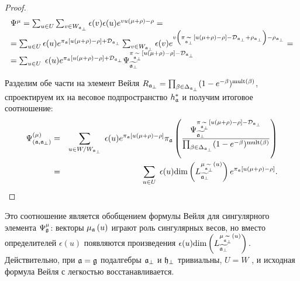 \begin{proof}
\begin{equation*}
\begin{array}{l}
\Psi^{\mu }=\sum_{u\in U}\sum_{v\in W_{\af_{\perp }}}
\epsilon (v)\epsilon (u)e^{vu(\mu +\rho )-\rho }= \\
=\sum_{u\in U}\epsilon (u)e^{\pi _{\af}\left[ u(\mu +\rho )-\rho \right]
+\mathcal{D}_{\af_{\perp }}}\sum_{v\in W_{\af_{\perp }}}\epsilon
(v)e^{v\left( \pi _{ \widetilde{\af_{\perp }} }\left[
u(\mu +\rho )-\rho \right] -\mathcal{D}_{\af_{\perp }}+\rho _{\af%
_{\perp }}\right) -\rho _{\af_{\perp }}}= \\
=\sum_{u\in U}\;\epsilon (u)e^{\pi _{\af }\left[ u(\mu
+\rho )-\rho \right] +\mathcal{D}_{\af_{\perp }}}\Psi _{\widetilde{%
\af_{\perp }}}^{\pi _{ \widetilde{\af_{\perp }} }%
\left[ u(\mu +\rho )-\rho \right] -\mathcal{D}_{\af_{\perp }}}
\end{array}
\end{equation*}

Разделим обе части на элемент Вейля  $R_{\mathfrak{a}_{\perp }}=\prod_{\beta \in \Delta _{\mathfrak{a}_{\perp}}}(1-e^{-\beta })^{\mathrm{mult}(\beta )}$, спроектируем их на весовое подпространство  $h_{\mathfrak{a}}^{\ast }$ и получим итоговое соотношение:
\begin{eqnarray*}
\Psi ^{\left( \mu \right) }_{\left(  \af, \afb \right)}
&=&\sum_{u\in W/W_{\af_{\perp }}}\;\epsilon (u)e^{\pi _{\frak{a%
}}\left[ u(\mu +\rho )-\rho \right] }\pi _{%
\af}\left( \frac{\Psi _{\widetilde{\af_{\perp }}}^{\pi _{
\widetilde{\af_{\perp }} }\left[ u(\mu +\rho )-\rho \right] -%
\mathcal{D}_{\af_{\perp }}}}{\prod_{\beta \in \Delta _{\af_{\perp
}}}(1-e^{-\beta })^{\mathrm{mult}(\beta )}}\right)  \\
&=&\sum_{u\in U}\;\epsilon (u)\mathrm{\dim }\left( L_{\widetilde{\af%
_{\perp }}}^{\mu _{\widetilde{\af_{\perp }}}\left( u\right) }\right)
e^{\pi _{\af}\left[ u(\mu +\rho )-\rho \right] }.
\end{eqnarray*}
\end{proof}


\begin{remark}
Это соотношение является обобщением формулы Вейля для сингулярного элемента  $\Psi _{\mathfrak{g}}^{\mu }$: векторы  $\mu_{\mathfrak{a}}\left(u\right)$ играют роль сингулярных весов, но вместо определителей $\epsilon (u)$ появляются произведения  $\epsilon(u)\mathrm{\dim }\left( L_{\widetilde{\mathfrak{a}_{\perp}}}^{\mu _{\widetilde{\mathfrak{a}_{\perp}}}\left(u\right) }\right).$ Действительно, при  $\frak{a=g}$ подалгебры  $\mathfrak{a}_{\perp}$ и $\mathfrak{h}_{\perp }$ тривиальны, $U=W$ , и исходная формула Вейля с легкостью восстанавливается. 
\end{remark}

